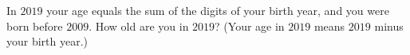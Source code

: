 In $2019$ your age equals the sum of the digits of your birth year, and you were born before $2009$. How old are you in $2019$? (Your age in $2019$ means $2019$ minus your birth year.)
